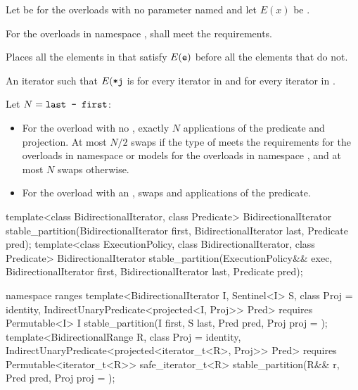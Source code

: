 \begin{itemdescr}
\pnum
Let  be  for the overloads
with no parameter named 
and let $E(x)$ be .

\pnum
\requires
For the overloads in namespace ,
 shall meet the
 requirements.

\pnum
\effects Places all the elements  in 
that satisfy $E(\texttt{e})$ before all the elements that do not.

\pnum
\returns An iterator  such that $E(\texttt{*j}$ is 
for every iterator  in
 and  for every iterator  in
.

\pnum
\complexity Let $N = \texttt{last - first}$:
\begin{itemize}
\item For the overload with no , exactly $N$ applications
of the predicate and projection.  At most $N / 2$ swaps if the type of  meets the
 requirements
for the overloads in namespace  or
models  for the
overloads in namespace ,
and at most $N$ swaps otherwise.
\item For the overload with an ,
 swaps and  applications of the predicate.
\end{itemize}

\end{itemdescr}

%
\begin{itemdecl}
template<class BidirectionalIterator, class Predicate>
  BidirectionalIterator
    stable_partition(BidirectionalIterator first, BidirectionalIterator last, Predicate pred);
template<class ExecutionPolicy, class BidirectionalIterator, class Predicate>
  BidirectionalIterator
    stable_partition(ExecutionPolicy&& exec,
                     BidirectionalIterator first, BidirectionalIterator last, Predicate pred);

namespace ranges {
  template<BidirectionalIterator I, Sentinel<I> S, class Proj = identity,
      IndirectUnaryPredicate<projected<I, Proj>> Pred>
    requires Permutable<I>
    I stable_partition(I first, S last, Pred pred, Proj proj = {});
  template<BidirectionalRange R, class Proj = identity,
      IndirectUnaryPredicate<projected<iterator_t<R>, Proj>> Pred>
    requires Permutable<iterator_t<R>>
    safe_iterator_t<R> stable_partition(R&& r, Pred pred, Proj proj = {});
}
\end{itemdecl}


